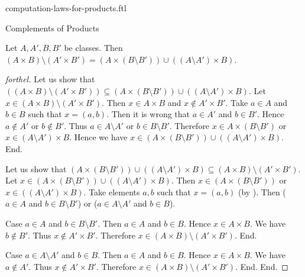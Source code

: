 \documentclass{naproche-library}
\begin{document}
\begin{smodule}[title=Computation Laws for Cartesian Products]{computation-laws-for-products.ftl}
\begin{sfragment}{Complements of Products}
  \begin{proposition}[forthel,id=FOUNDATIONS_05_5552125989879808]
    Let $A, A', B, B'$ be classes.
    Then $(A \times B) \setminus (A' \times B') = (A \times (B \setminus B')) \cup ((A \setminus A') \times B)$.
  \end{proposition}
  \begin{proof}[forthel]
    Let us show that $((A \times B) \setminus (A' \times B')) \subseteq (A \times (B \setminus B')) \cup ((A \setminus A') \times B)$.
      Let $x \in (A \times B) \setminus (A' \times B')$.
      Then $x \in A \times B$ and $x \notin A' \times B'$.
      Take $a \in A$ and $b \in B$ such that $x = (a, b)$.
      Then it is wrong that $a \in A'$ and $b \in B'$.
      Hence $a \notin A'$ or $b \notin B'$.
      Thus $a \in A \setminus A'$ or $b \in B \setminus B'$.
      Therefore $x \in A \times (B \setminus B')$ or $x \in (A \setminus A') \times B$.
      Hence we have $x \in (A \times (B \setminus B')) \cup ((A \setminus A') \times B)$.
    End.

    Let us show that $(A \times (B \setminus B')) \cup ((A \setminus A') \times B) \subseteq (A \times B) \setminus (A' \times B')$.
      Let $x \in (A \times (B \setminus B')) \cup ((A \setminus A') \times B)$.
      Then $x \in (A \times (B \setminus B'))$ or $x \in ((A \setminus A') \times B)$.
      Take elements $a,b$ such that $x = (a, b)$ (by ).
      Then ($a \in A$ and $b \in B \setminus B'$) or ($a \in A \setminus A'$ and $b \in B$).

      Case $a \in A$ and $b \in B \setminus B'$.
        Then $a \in A$ and $b \in B$.
        Hence $x \in A \times B$.
        We have $b \notin B'$.
        Thus $x \notin A' \times B'$.
        Therefore $x \in (A \times B) \setminus (A' \times B')$.
      End.

      Case $a \in A \setminus A'$ and $b \in B$.
        Then $a \in A$ and $b \in B$.
        Hence $x \in A \times B$.
        We have $a \notin A'$.
        Thus $x \notin A' \times B'$.
        Therefore $x \in (A \times B) \setminus (A' \times B')$.
      End.
    End.
  \end{proof}
\end{sfragment}
\end{smodule}
\end{document}

